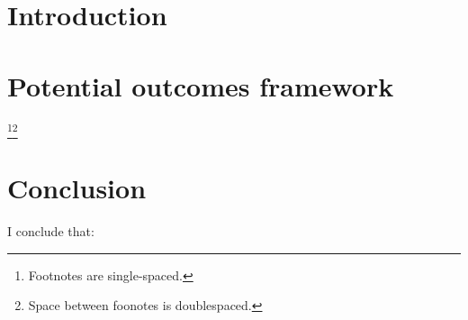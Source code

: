 \section{Introduction}
\blindmathtrue\blindtext

\section{Potential outcomes framework}
\label{sec:potent-outc-fram}
\blindmathtrue\blindtext\footnote{Footnotes are single-spaced.
  \blindtext}\footnote{Space between foonotes is doublespaced. \blindtext}

\section{Conclusion}
I conclude that:
\blinditemize
